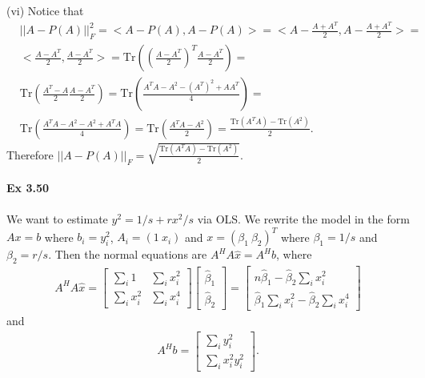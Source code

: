 \documentclass[letterpaper,12pt]{article}
\theoremstyle{definition}
\begin{document}
\begin{spacing}{1.3}{}
	(vi)
	Notice that
	\begin{align*}
	&||A - P(A)||_F^2 = <A - P(A), A - P(A)> =
	<A - \frac{A + A^T}{2}, A - \frac{A + A^T}{2}> =\\
	&<\frac{A - A^T}{2}, \frac{A - A^T}{2}> =
	\text{Tr}\left(\left(\frac{A - A^T}{2}\right)^T\frac{A - A^T}{2}\right)=\\
	&\text{Tr}\left(\frac{A^T - A}{2}\frac{A - A^T}{2}\right) =
	\text{Tr}\left(\frac{A^TA - A^2 - (A^T)^2 + AA^T}{4}\right) =\\
	&\text{Tr}\left(\frac{A^TA - A^2 - A^2 + A^TA}{4}\right) =
	\text{Tr}\left(\frac{A^TA - A^2}{2}\right) =
	\frac{\text{Tr}(A^TA) - \text{Tr}(A^2)}{2}.
	\end{align*}
	Therefore $||A - P(A)||_F = \sqrt{\frac{\text{Tr}(A^TA) - \text{Tr}(A^2)}{2}}$. \\\\
	
	\textbf{Ex 3.50} \\\\
	We want to estimate $y^2=1/s+rx^2/s$ via OLS.
	We rewrite the model in the form $Ax=b$ where
	$b_i=y_i^2$, $A_i=(1\ x_i)$ and $x=(\beta_1\ \beta_2)^T$ where $\beta_1=1/s$ and $\beta_2=r/s$.
	Then the normal equations are $A^HA\hat{x}=A^Hb$, where
	\begin{align*}
	A^HA\hat{x} =
	\begin{bmatrix}
	\sum_i 1 & \sum_ix_i^2\\
	\sum_ix_i^2& \sum_ix_i^4
	\end{bmatrix}
	\begin{bmatrix}
	\hat{\beta}_1\\ \hat{\beta}_2
	\end{bmatrix} =
	\begin{bmatrix}
	n\hat{\beta}_1 - \hat{\beta}_2\sum_i x_i^2\\
	\hat{\beta}_1\sum_ix_i^2 - \hat{\beta}_2\sum_ix_i^4
	\end{bmatrix}
	\end{align*}
	and
	\begin{align*}
	A^Hb=
	\begin{bmatrix}
	\sum_i y_i^2\\
	\sum_i x_i^2y_i^2
	\end{bmatrix}.
	\end{align*}
	
	

 \end{spacing}
\end{document}
